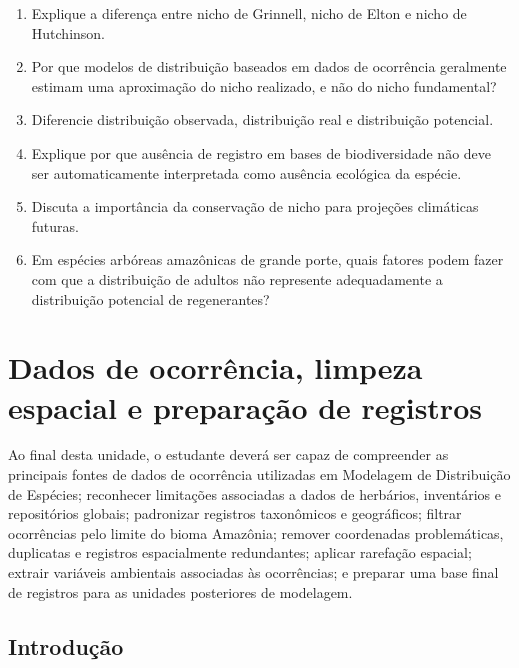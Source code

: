 \documentclass{ueap-sdm}
\begin{document}
\begin{exercicios}
\begin{enumerate}
  \item Explique a diferença entre nicho de Grinnell, nicho de Elton e nicho de Hutchinson.
  \item Por que modelos de distribuição baseados em dados de ocorrência geralmente estimam uma aproximação do nicho realizado, e não do nicho fundamental?
  \item Diferencie distribuição observada, distribuição real e distribuição potencial.
  \item Explique por que ausência de registro em bases de biodiversidade não deve ser automaticamente interpretada como ausência ecológica da espécie.
  \item Discuta a importância da conservação de nicho para projeções climáticas futuras.
  \item Em espécies arbóreas amazônicas de grande porte, quais fatores podem fazer com que a distribuição de adultos não represente adequadamente a distribuição potencial de regenerantes?
\end{enumerate}
\end{exercicios}


\chapter[Dados de ocorrência]{Dados de ocorrência, limpeza espacial e preparação de registros}

\begin{objetivos}
	Ao final desta unidade, o estudante deverá ser capaz de compreender as principais fontes de dados de ocorrência utilizadas em Modelagem de Distribuição de Espécies; reconhecer limitações associadas a dados de herbários, inventários e repositórios globais; padronizar registros taxonômicos e geográficos; filtrar ocorrências pelo limite do bioma Amazônia; remover coordenadas problemáticas, duplicatas e registros espacialmente redundantes; aplicar rarefação espacial; extrair variáveis ambientais associadas às ocorrências; e preparar uma base final de registros para as unidades posteriores de modelagem.
\end{objetivos}

\section{Introdução}
\end{document}
